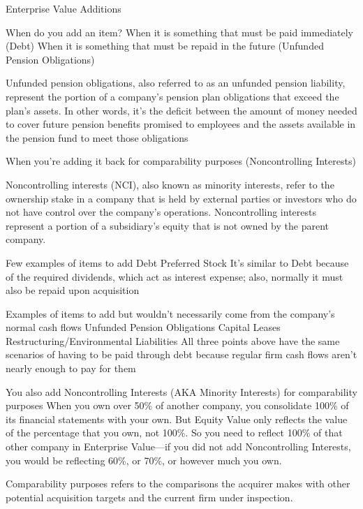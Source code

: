 \documentclass[10pt]{article}
\begin{document}
    \begin{core}{Enterprise Value Additions}

      When do you add an item?
      When it is something that must be paid immediately (Debt)
      When it is something that must be repaid in the future (Unfunded Pension Obligations)

      Unfunded pension obligations, also referred to as an unfunded pension liability, represent the portion of a company’s pension plan obligations that exceed the plan’s assets. In other words, it’s the deficit between the amount of money needed to cover future pension benefits promised to employees and the assets available in the pension fund to meet those obligations

      When you’re adding it back for comparability purposes (Noncontrolling Interests)

      Noncontrolling interests (NCI), also known as minority interests, refer to the ownership stake in a company that is held by external parties or investors who do not have control over the company’s operations. Noncontrolling interests represent a portion of a subsidiary’s equity that is not owned by the parent company.

      Few examples of items to add
      Debt
      Preferred Stock
      It’s similar to Debt because of the required dividends, which act as interest expense; also, normally it must also be repaid upon acquisition

      Examples of items to add but wouldn’t necessarily come from the company’s normal cash flows
      Unfunded Pension Obligations
      Capital Leases
      Restructuring/Environmental Liabilities
      All three points above have the same scenarios of having to be paid through debt because regular firm cash flows aren’t nearly enough to pay for them

      You also add Noncontrolling Interests (AKA Minority Interests) for comparability purposes
      When you own over 50\% of another company, you consolidate 100\% of its financial statements with your own. But Equity Value only reflects the value of the percentage that you own, not 100\%. So you need to reflect 100\% of that other company in Enterprise Value—if you did not add Noncontrolling Interests, you would be reflecting 60\%, or 70\%, or however much you own.

      Comparability purposes refers to the comparisons the acquirer makes with other potential acquisition targets and the current firm under inspection.

    \end{core}
\end{document}
